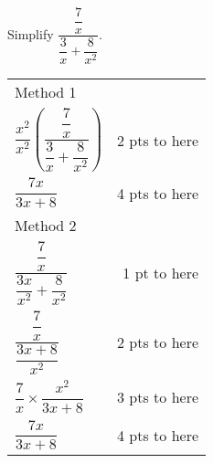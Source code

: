 {
	Simplify $ \dfrac{\dfrac{7}{x}}{\dfrac{3}{x}+\dfrac{8}{x^2}}$.
}
{
	\begin{tabular}{l r}
	Method 1 \\
	$\dfrac{x^2}{x^2}\left(\dfrac{\dfrac{7}{x}}{\dfrac{3}{x}+\dfrac{8}{x^2}}\right)$& 2 pts to here\\
	$\dfrac{7x}{3x+8}$ & 4 pts to here\\
	Method 2\\
	$\dfrac{\dfrac{7}{x}}{\dfrac{3x}{x^2}+\dfrac{8}{x^2}}$ & 1 pt to here\\
	$\dfrac{\dfrac{7}{x}}{\dfrac{3x+8}{x^2}}$ & 2 pts to here\\
	$\dfrac{7}{x} \times \dfrac{x^2}{3x+8}$ & 3 pts to here\\
	$\dfrac{7x}{3x+8}$ & 4 pts to here
	\end{tabular}
}

